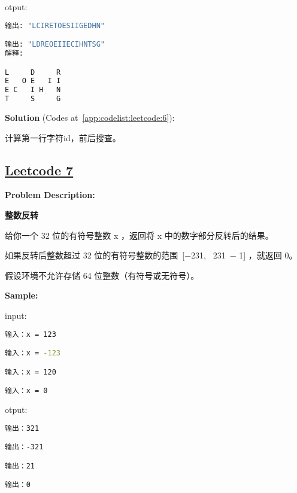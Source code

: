 otput:\par

\begin{lstlisting}[language=bash]
输出: "LCIRETOESIIGEDHN"

输出: "LDREOEIIECIHNTSG"
解释:

L     D     R
E   O E   I I
E C   I H   N
T     S     G
\end{lstlisting}

\textbf{Solution }(Codes at~\ref{app:codelist:leetcode:6}):\par

计算第一行字符id，前后搜查。\par



\subsection{\href{https://leetcode-cn.com/}{Leetcode 7}}\label{app:problemlist:leetcode:7}

\textbf{Problem Description:}\par

\textbf{整数反转}\par

给你一个 32 位的有符号整数 x ，返回将 x 中的数字部分反转后的结果。\par

如果反转后整数超过 32 位的有符号整数的范围 [−231,  231 − 1] ，就返回 0。\par

假设环境不允许存储 64 位整数（有符号或无符号）。\par



\textbf{Sample:}\par

input:\par

\begin{lstlisting}[language=bash]
输入：x = 123

输入：x = -123

输入：x = 120

输入：x = 0
\end{lstlisting}

otput:\par

\begin{lstlisting}[language=bash]
输出：321

输出：-321

输出：21

输出：0
\end{lstlisting}

